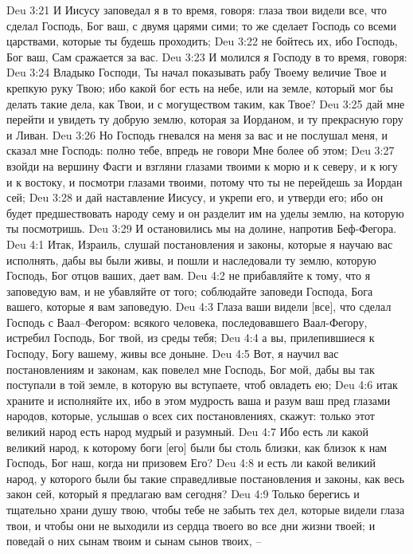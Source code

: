 Deu 3:21  И Иисусу заповедал я в то время, говоря: глаза твои видели все, что сделал Господь, Бог ваш, с двумя царями сими; то же сделает Господь со всеми царствами, которые ты будешь проходить;
Deu 3:22  не бойтесь их, ибо Господь, Бог ваш, Сам сражается за вас.
Deu 3:23  И молился я Господу в то время, говоря:
Deu 3:24  Владыко Господи, Ты начал показывать рабу Твоему величие Твое и крепкую руку Твою; ибо какой бог есть на небе, или на земле, который мог бы делать такие дела, как Твои, и с могуществом таким, как Твое?
Deu 3:25  дай мне перейти и увидеть ту добрую землю, которая за Иорданом, и ту прекрасную гору и Ливан.
Deu 3:26  Но Господь гневался на меня за вас и не послушал меня, и сказал мне Господь: полно тебе, впредь не говори Мне более об этом;
Deu 3:27  взойди на вершину Фасги и взгляни глазами твоими к морю и к северу, и к югу и к востоку, и посмотри глазами твоими, потому что ты не перейдешь за Иордан сей;
Deu 3:28  и дай наставление Иисусу, и укрепи его, и утверди его; ибо он будет предшествовать народу сему и он разделит им на уделы землю, на которую ты посмотришь.
Deu 3:29  И остановились мы на долине, напротив Беф-Фегора.
Deu 4:1  Итак, Израиль, слушай постановления и законы, которые я научаю вас исполнять, дабы вы были живы, и пошли и наследовали ту землю, которую Господь, Бог отцов ваших, дает вам.
Deu 4:2  не прибавляйте к тому, что я заповедую вам, и не убавляйте от того; соблюдайте заповеди Господа, Бога вашего, которые я вам заповедую.
Deu 4:3  Глаза ваши видели [все], что сделал Господь с Ваал--Фегором: всякого человека, последовавшего Ваал-Фегору, истребил Господь, Бог твой, из среды тебя;
Deu 4:4  а вы, прилепившиеся к Господу, Богу вашему, живы все доныне.
Deu 4:5  Вот, я научил вас постановлениям и законам, как повелел мне Господь, Бог мой, дабы вы так поступали в той земле, в которую вы вступаете, чтоб овладеть ею;
Deu 4:6  итак храните и исполняйте их, ибо в этом мудрость ваша и разум ваш пред глазами народов, которые, услышав о всех сих постановлениях, скажут: только этот великий народ есть народ мудрый и разумный.
Deu 4:7  Ибо есть ли какой великий народ, к которому боги [его] были бы столь близки, как близок к нам Господь, Бог наш, когда ни призовем Его?
Deu 4:8  и есть ли какой великий народ, у которого были бы такие справедливые постановления и законы, как весь закон сей, который я предлагаю вам сегодня?
Deu 4:9  Только берегись и тщательно храни душу твою, чтобы тебе не забыть тех дел, которые видели глаза твои, и чтобы они не выходили из сердца твоего во все дни жизни твоей; и поведай о них сынам твоим и сынам сынов твоих, --
